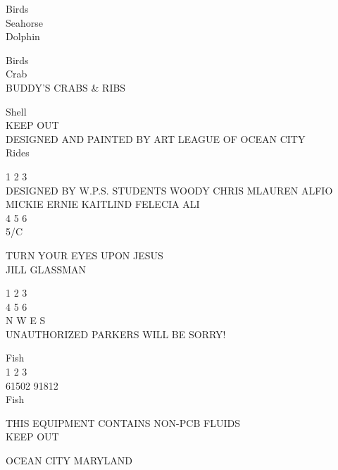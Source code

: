 \documentclass[10pt,letterpaper]{article}
\begin{document}
Birds\\
Seahorse\\
Dolphin

Birds\\
Crab\\
BUDDY'S CRABS \& RIBS

Shell\\
KEEP OUT\\
DESIGNED AND PAINTED BY ART LEAGUE OF OCEAN CITY\\
Rides

1 2 3\\
DESIGNED BY W.P.S. STUDENTS WOODY CHRIS MLAUREN ALFIO MICKIE ERNIE KAITLIND FELECIA ALI\\
4 5 6\\
5/C

TURN YOUR EYES UPON JESUS\\
JILL GLASSMAN

1 2 3\\
4 5 6\\
N W E S\\
UNAUTHORIZED PARKERS WILL BE SORRY!

Fish\\
1 2 3\\
61502 91812\\
Fish

THIS EQUIPMENT CONTAINS NON{-}PCB FLUIDS\\
KEEP OUT

OCEAN CITY MARYLAND
\pagebreak
\end{document}
